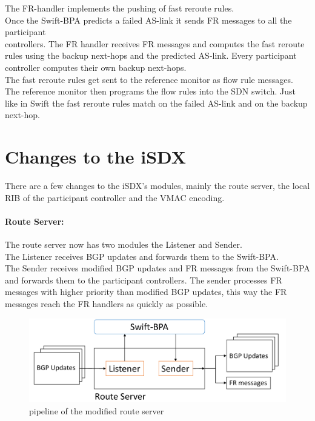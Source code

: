 The FR-handler implements the pushing of fast reroute rules.  \\
Once the Swift-BPA predicts a failed AS-link it sends FR messages to all the participant \\ controllers.
The FR handler receives FR messages and computes the fast reroute rules using the backup next-hops and the predicted AS-link. Every participant controller computes their own backup next-hops. \\ The fast reroute rules get sent to the reference monitor as flow rule messages. The reference monitor then programs the flow rules into the SDN switch. Just like in Swift the fast reroute rules match on the failed AS-link and on the backup next-hop.    

\newpage

\section{\label{chapter3:Changes_to_the_iSDX}Changes to the iSDX}

There are a few changes to the iSDX's modules, mainly the route server, the local RIB of the participant controller and the VMAC encoding. 

\paragraph{\label{chapter3:Changes to the iSDX:route server}Route Server:}

The route server now has two modules the Listener and Sender. \\
The Listener receives BGP updates and forwards them to the Swift-BPA. \\
The Sender receives modified BGP updates and FR messages from the Swift-BPA and forwards them to the participant controllers. The sender processes FR messages with higher priority than modified BGP updates, this way the FR messages reach the FR handlers as quickly as possible. 

\begin{figure}[h]
\center
\includegraphics[scale = 0.45]{Figures/design_route_server_cropped2.pdf}
\caption{pipeline of the modified route server}
\end{figure}



